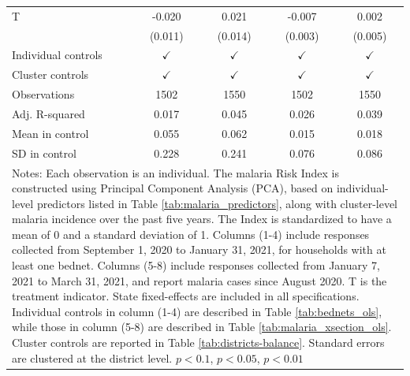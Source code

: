 {{\begin{tabular}{l*{4}{c}}
\hline 
T               &   -0.020\sym{*}  &    0.021         &   -0.007\sym{**} &    0.002         \\
                &  (0.011)         &  (0.014)         &  (0.003)         &  (0.005)         \\
Individual controls&$\checkmark$         &$\checkmark$         &$\checkmark$         &$\checkmark$         \\
Cluster controls&$\checkmark$         &$\checkmark$         &$\checkmark$         &$\checkmark$         \\
\hline
Observations    &\num{1502}         &\num{1550}         &\num{1502}         &\num{1550}         \\
Adj. R-squared  &    0.017         &    0.045         &    0.026         &    0.039         \\
Mean in control &    0.055         &    0.062         &    0.015         &    0.018         \\
SD in control   &    0.228         &    0.241         &    0.076         &    0.086         \\
\hline\hline
\multicolumn{5}{p{.82\linewidth}}{\scriptsize Notes: Each observation is an individual. The malaria Risk Index is constructed using Principal Component Analysis (PCA), based on individual-level predictors listed in Table \ref{tab:malaria_predictors}, along with cluster-level malaria incidence over the past five years.  The Index is standardized to have a mean of 0 and a standard deviation of 1. Columns (1-4) include responses collected from September 1, 2020 to January 31, 2021, for households with at least one bednet.  Columns (5-8) include responses collected from January 7, 2021 to March 31, 2021, and report malaria cases since August 2020. T is the treatment indicator. State fixed-effects are included in all specifications. Individual controls in column (1-4) are described in Table \ref{tab:bednets_ols}, while those in column (5-8) are described in Table \ref{tab:malaria_xsection_ols}. Cluster controls are reported in Table \ref{tab:districts-balance}. Standard errors are clustered at the district level. \sym{*} \(p<0.1\), \sym{**} \(p<0.05\), \sym{***} \(p<0.01\)}\\
\end{tabular}
}%

}
